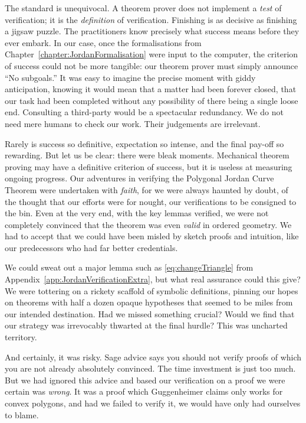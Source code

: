 The standard is unequivocal. A theorem prover does not implement a \emph{test} of verification; it is the \emph{definition} of verification. Finishing is as decisive as finishing a jigsaw puzzle. The practitioners know precisely what success means before they ever embark. In our case, once the formalisations from Chapter~\ref{chapter:JordanFormalisation} were input to the computer, the criterion of success could not be more tangible: our theorem prover must simply announce ``No subgoals.'' It was easy to imagine the precise moment with giddy anticipation, knowing it would mean that a matter had been forever closed, that our task had been completed without any possibility of there being a single loose end. Consulting a third-party would be a spectacular redundancy. We do not need mere humans to check our work. Their judgements are irrelevant. 

Rarely is success so definitive, expectation so intense, and the final pay-off so rewarding. But let us be clear: there were bleak moments. Mechanical theorem proving may have a definitive criterion of success, but it is useless at measuring ongoing progress. Our adventures in verifying the Polygonal Jordan Curve Theorem were undertaken with \emph{faith}, for we were always haunted by doubt, of the thought that our efforts were for nought, our verifications to be consigned to the bin. Even at the very end, with the key lemmas verified, we were not completely convinced that the theorem was even \emph{valid} in ordered geometry. We had to accept that we could have been misled by sketch proofs and intuition, like our predecessors who had far better credentials. 

We could sweat out a major lemma such as \eqref{eq:changeTriangle} from Appendix~\ref{app:JordanVerificationExtra}, but what real assurance could this give? We were tottering on a rickety scaffold of symbolic definitions, pinning our hopes on theorems with half a dozen opaque hypotheses that seemed to be miles from our intended destination. Had we missed something crucial? Would we find that our strategy was irrevocably thwarted at the final hurdle? This was uncharted territory.

And certainly, it was risky. Sage advice says you should not verify proofs of which you are not already absolutely convinced. The time investment is just too much. But we had ignored this advice and based our verification on a proof we were certain was \emph{wrong}. It was a proof which Guggenheimer claims only works for convex polygons, and had we failed to verify it, we would have only had ourselves to blame.

